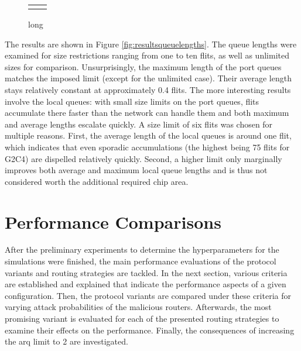 \begin{figure}
    \centering
    \begin{tabular}{ll}
         & 
    \end{tabular}
    \caption[Results for router queue lengths experiment]{long}
    \label{fig:resultsqueuelengths}
\end{figure}

The results are shown in Figure \vref{fig:resultsqueuelengths}. The queue lengths were examined for size restrictions ranging from one to ten flits,
as well as unlimited sizes for comparison. Unsurprisingly, the maximum length of the port queues matches the imposed limit (except for the unlimited
case). Their average length stays relatively constant at approximately 0.4 flits. The more interesting results involve the local queues: with small
size limits on the port queues, flits accumulate there faster than the network can handle them and both maximum and average lengths escalate quickly.
A size limit of six flits was chosen for multiple reasons. First, the average length of the local queues is around one flit, which indicates that even
sporadic accumulations (the highest being 75 flits for G2C4) are dispelled relatively quickly. Second, a higher limit only marginally improves both
average and maximum local queue lengths and is thus not considered worth the additional required chip area.

\section{Performance Comparisons}\label{sec:perfcompeval}
After the preliminary experiments to determine the hyperparameters for the simulations were finished, the main performance evaluations of the protocol
variants and routing strategies are tackled. In the next section, various criteria are established and explained that indicate the performance aspects
of a given configuration. Then, the protocol variants are compared under these criteria for varying attack probabilities of the malicious routers.
Afterwards, the most promising variant is evaluated for each of the presented routing strategies to examine their effects on the performance. Finally,
the consequences of increasing the \gls{arq} limit to 2 are investigated.

